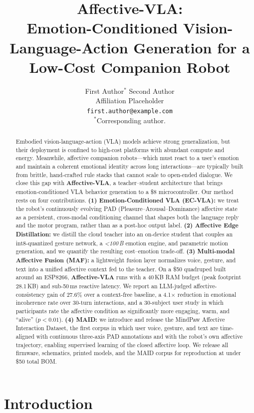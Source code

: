 \documentclass{article}
\title{Affective-VLA:\\ Emotion-Conditioned Vision-Language-Action Generation
       for a Low-Cost Companion Robot}
\author{%
  First Author$^{*}$ \quad Second Author \\
  {Affiliation Placeholder} \\
  \texttt{first.author@example.com} \\
  $^{*}$Corresponding author.
}
\newcommand{\method}{\textbf{Affective-VLA}}
\theoremstyle{definition}
\begin{document}
\maketitle

\begin{abstract}
Embodied vision-language-action (VLA) models achieve strong generalization,
but their deployment is confined to high-cost platforms with abundant compute
and energy. Meanwhile, affective companion robots---which must react to a user's
emotion and maintain a coherent emotional identity across long interactions---are
typically built from brittle, hand-crafted rule stacks that cannot scale to
open-ended dialogue. We close this gap with \method{}, a teacher--student
architecture that brings emotion-conditioned VLA behavior generation to a
\$8 microcontroller. Our method rests on four contributions.
\textbf{(1) Emotion-Conditioned VLA (EC-VLA):} we treat the robot's continuously
evolving PAD (Pleasure--Arousal--Dominance) affective state \cite{mehrabian1996pad}
as a persistent, cross-modal conditioning channel that shapes both the language
reply and the motor program, rather than as a post-hoc output label.
\textbf{(2) Affective Edge Distillation:} we distill the cloud teacher into an
on-device student that couples an int8-quantized gesture network, a
\emph{<100\,B} emotion engine, and parametric motion generation, and we quantify
the resulting cost--emotion trade-off. \textbf{(3) Multi-modal Affective Fusion
(MAF):} a lightweight fusion layer normalizes voice, gesture, and text into a
unified affective context fed to the teacher. On a \$50 quadruped built around an
ESP8266, \method{} runs with a 40\,KB RAM budget (peak footprint 28.1\,KB) and
sub-50\,ms reactive latency. We report an LLM-judged affective-consistency gain
of 27.6\% over a context-free baseline, a 4.1$\times$ reduction in emotional
incoherence rate over 30-turn interactions, and a 30-subject user study in which
participants rate the affective condition as significantly more engaging,
warm, and ``alive'' ($p<0.01$). \textbf{(4) MAID:} we introduce and release the
MindPaw Affective Interaction Dataset, the first corpus in which user voice,
gesture, and text are time-aligned with continuous three-axis PAD annotations
and with the robot's own affective trajectory, enabling supervised learning of
the closed affective loop. We release all firmware, schematics, printed models,
and the MAID corpus for reproduction at under \$50 total BOM.
\end{abstract}

\section{Introduction}
\end{document}
